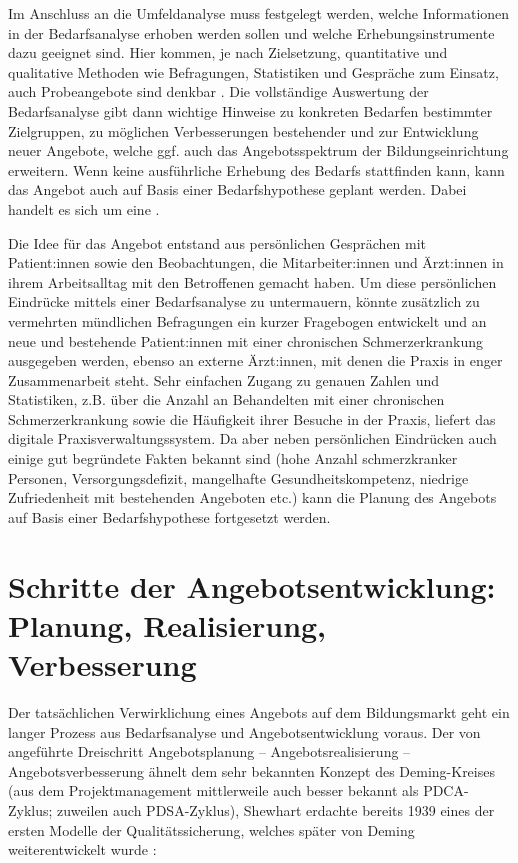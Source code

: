 \documentclass[
  twoside,
  parskip=half-,
  paper=176mm:246mm,
  BCOR=14mm,
  DIV=14,
]{scrreprt}
\begin{document}
Im Anschluss an die Umfeldanalyse muss festgelegt werden, welche Informationen in der Bedarfsanalyse erhoben werden sollen und welche Erhebungsinstrumente dazu geeignet sind. Hier kommen, je nach Zielsetzung, quantitative und qualitative Methoden wie Befragungen, Statistiken und Gespräche zum Einsatz, auch Probeangebote sind denkbar \autocite[vgl.][14]{kos}. Die vollständige Auswertung der Bedarfsanalyse gibt dann wichtige Hinweise zu konkreten Bedarfen bestimmter Zielgruppen, zu möglichen Verbesserungen bestehender und zur Entwicklung neuer Angebote, welche ggf. auch das Angebotsspektrum der Bildungseinrichtung erweitern. Wenn keine ausführliche Erhebung des Bedarfs stattfinden kann, kann das Angebot auch auf Basis einer Bedarfshypothese geplant werden. Dabei handelt es sich um eine .

\begin{praxis}
  Die Idee für das Angebot entstand aus persönlichen Gesprächen mit Patient:innen sowie den Beobachtungen, die Mitarbeiter:innen und Ärzt:innen in ihrem Arbeitsalltag mit den Betroffenen gemacht haben. Um diese persönlichen Eindrücke mittels einer Bedarfsanalyse zu untermauern, könnte zusätzlich zu vermehrten mündlichen Befragungen ein kurzer Fragebogen entwickelt und an neue und bestehende Patient:innen mit einer chronischen Schmerzerkrankung ausgegeben werden, ebenso an externe Ärzt:innen, mit denen die Praxis in enger Zusammenarbeit steht. Sehr einfachen Zugang zu genauen Zahlen und Statistiken, z.B. über die Anzahl an Behandelten mit einer chronischen Schmerzerkrankung sowie die Häufigkeit ihrer Besuche in der Praxis, liefert das digitale Praxisverwaltungssystem. Da aber neben persönlichen Eindrücken auch einige gut begründete Fakten bekannt sind (hohe Anzahl schmerzkranker Personen, Versorgungsdefizit, mangelhafte Gesundheitskompetenz, niedrige Zufriedenheit mit bestehenden Angeboten etc.) kann die Planung des Angebots auf Basis einer Bedarfshypothese fortgesetzt werden.
\end{praxis}
    

\section{Schritte der Angebotsentwicklung: Planung, Realisierung, Verbesserung}

Der tatsächlichen Verwirklichung eines Angebots auf dem Bildungsmarkt geht ein langer Prozess aus Bedarfsanalyse und Angebotsentwicklung voraus. Der von \citeauthor{schlutz} angeführte Dreischritt Angebotsplanung -- Angebotsrealisierung -- Angebotsverbesserung ähnelt dem sehr bekannten Konzept des Deming-Kreises  (aus dem Projektmanagement mittlerweile auch besser bekannt als PDCA-Zyklus; zuweilen auch PDSA-Zyklus), Shewhart erdachte bereits 1939 eines der ersten Modelle der Qualitätssicherung, welches später von Deming weiterentwickelt wurde \autocite[vgl.][6]{PDCA}:
\end{document}
